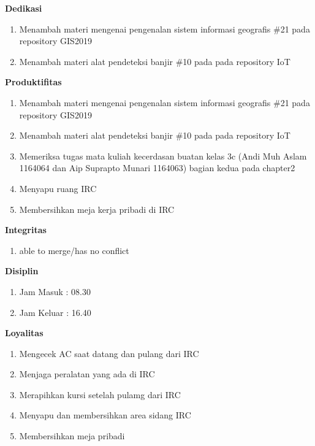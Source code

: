 \begin{enumerate}
\textbf{Dedikasi}
\begin{enumerate}
\item Menambah materi mengenai pengenalan sistem informasi geografis \#21 pada repository GIS2019
\item Menambah materi alat pendeteksi banjir \#10 pada pada repository IoT 
\end{enumerate}

\textbf{Produktifitas}
\begin{enumerate}
\item Menambah materi mengenai pengenalan sistem informasi geografis \#21 pada repository GIS2019
\item Menambah materi alat pendeteksi banjir \#10 pada pada repository IoT 
\item Memeriksa tugas mata kuliah kecerdasan buatan kelas 3c (Andi Muh Aslam 1164064 dan Aip Suprapto Munari 1164063) bagian kedua pada chapter2
\item Menyapu ruang IRC
\item Membersihkan meja kerja pribadi di IRC
\end{enumerate}

\textbf{Integritas}
\begin{enumerate}
\item able to merge/has no conflict
\end{enumerate}


\textbf{Disiplin}
\begin{enumerate}
\item Jam Masuk : 08.30
\item Jam Keluar : 16.40
\end{enumerate}


\textbf{Loyalitas}
\begin{enumerate}
\item Mengecek AC saat datang dan pulang dari IRC
\item Menjaga peralatan yang ada di IRC
\item Merapihkan kursi setelah pulamg dari IRC
\item Menyapu dan membersihkan area sidang IRC
\item Membersihkan meja pribadi
\end{enumerate}
\end{enumerate}

